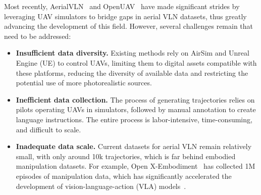 Most recently, AerialVLN~\cite{aerialVLN} and OpenUAV~\cite{openuav} have made significant strides by leveraging UAV simulators to bridge gaps in aerial VLN datasets, thus greatly advancing the development of this field. However, several challenges remain that need to be addressed:

\begin{itemize}[left=0pt]
\item \textbf{Insufficient data diversity.} Existing methods rely on AirSim and Unreal Engine (UE) to control UAVs, limiting them to digital assets compatible with these platforms, reducing the diversity of available data and restricting the potential use of more photorealistic sources.

\item \textbf{Inefficient data collection.} The process of generating trajectories relies on pilots operating UAVs in simulators, followed by manual annotation to create language instructions. The entire process is labor-intensive, time-consuming, and difficult to scale.

\item  \textbf{Inadequate data scale.} Current datasets for aerial VLN remain relatively small, with only around 10k trajectories, which is far behind embodied manipulation datasets. For example, Open X-Embodiment~\cite{open_x-embodiment} has collected 1M episodes of manipulation data, which has significantly accelerated the development of vision-language-action (VLA) models~\cite{spatialvla, wu2024robomind, nasiriany2024robocasa, yang2024pushing}.
\end{itemize}

